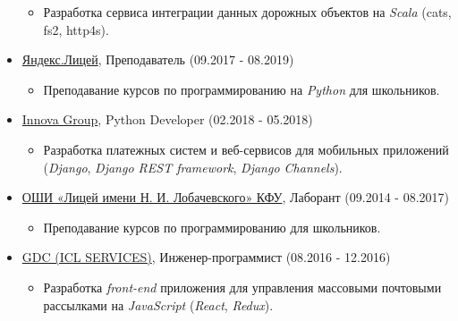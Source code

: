 \documentclass[11pt]{article}
\begin{document}
\begin{itemize}
\begin{itemize}
\item Разработка сервиса интеграции данных дорожных объектов на \emph{Scala} (cats,
fs2, http4s).
\end{itemize}
\item \href{https://yandexlyceum.ru/}{Яндекс.Лицей}, Преподаватель (09.2017 - 08.2019)
\begin{itemize}
\item Преподавание курсов по программированию на \emph{Python} для школьников.
\end{itemize}
\item \href{https://innovacompanies.com/}{Innova Group}, Python Developer (02.2018 - 05.2018)
\begin{itemize}
\item Разработка платежных систем и веб-сервисов для мобильных приложений
(\emph{Django}, \emph{Django REST framework}, \emph{Django Channels}).
\end{itemize}
\item \href{https://kpfu.ru/liceum}{ОШИ «Лицей имени Н. И. Лобачевского» КФУ}, Лаборант (09.2014 - 08.2017)
\begin{itemize}
\item Преподавание курсов по программированию для школьников.
\end{itemize}
\item \href{http://icl-services.com/}{GDC (ICL SERVICES)}, Инженер-программист (08.2016 - 12.2016)
\begin{itemize}
\item Разработка \emph{front-end} приложения для управления массовыми почтовыми
рассылками на \emph{JavaScript} (\emph{React}, \emph{Redux}).
\end{itemize}
\end{itemize}
\end{document}
